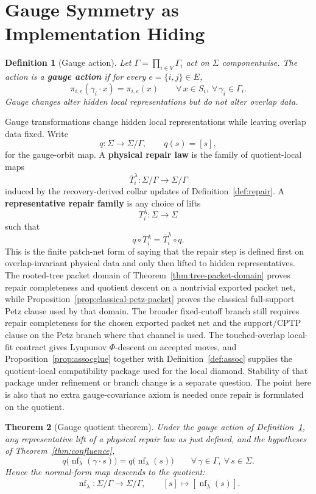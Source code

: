 \documentclass[11pt]{article}
\newtheorem{theorem}{Theorem}[section]
\newtheorem{definition}[theorem]{Definition}
\theoremstyle{remark}
\theoremstyle{plain}
\begin{document}
\section{Gauge Symmetry as Implementation Hiding}

\begin{definition}[Gauge action]\label{def:gauge}
Let $\Gamma = \prod_{i\in V}\Gamma_i$ act on $\Sigma$ componentwise. The action is a \textbf{gauge action} if for every $e=\{i,j\}\in E$,
\[
\pi_{i,e}(\gamma_i\cdot x)=\pi_{i,e}(x)
\qquad
\forall\, x\in S_i,\ \forall\, \gamma_i\in \Gamma_i.
\]
Gauge changes alter hidden local representations but do not alter overlap data.
\end{definition}

Gauge transformations change hidden local representations while leaving overlap data fixed. Write
\[
q:\Sigma\to \Sigma/\Gamma,
\qquad
q(s)=[s],
\]
for the gauge-orbit map. A \textbf{physical repair law} is the family of quotient-local maps
\[
\overline T_i^\lambda:\Sigma/\Gamma\to \Sigma/\Gamma
\]
induced by the recovery-derived collar updates of Definition~\ref{def:repair}. A
\textbf{representative repair family} is any choice of lifts
\[
T_i^\lambda:\Sigma\to\Sigma
\]
such that
\[
q\circ T_i^\lambda
=
\overline T_i^\lambda\circ q.
\]
This is the finite patch-net form of saying that the repair step is defined first on
overlap-invariant physical data and only then lifted to hidden representatives. The rooted-tree
packet domain of Theorem~\ref{thm:tree-packet-domain} proves repair completeness and quotient
descent on a nontrivial exported packet net, while Proposition~\ref{prop:classical-petz-packet}
proves the classical full-support Petz clause used by that domain. The broader fixed-cutoff
branch still requires repair completeness for the chosen exported packet net and the
support/CPTP clause on the Petz branch where that channel is used. The touched-overlap local-fit contract gives Lyapunov \(\Phi\)-descent on
accepted moves, and Proposition~\ref{prop:assocglue} together with
Definition~\ref{def:assoc} supplies the quotient-local compatibility package used for the local
diamond. Stability of that package under refinement or branch change is a separate question.
The point here is also that no extra gauge-covariance axiom is needed once repair is formulated
on the quotient.

\begin{theorem}[Gauge quotient theorem]\label{thm:gauge}
Under the gauge action of Definition~\ref{def:gauge}, any representative lift of a physical repair
law as just defined, and the hypotheses of Theorem~\ref{thm:confluence},
\[
q\bigl(\operatorname{nf}_\lambda(\gamma\cdot s)\bigr)
=
q\bigl(\operatorname{nf}_\lambda(s)\bigr)
\qquad
\forall\, \gamma\in\Gamma,\ \forall\, s\in\Sigma.
\]
Hence the normal-form map descends to the quotient:
\[
\overline{\operatorname{nf}}_\lambda:\Sigma/\Gamma \to \Sigma/\Gamma,
\qquad
[s]\mapsto [\operatorname{nf}_\lambda(s)].
\]
\end{theorem}
\end{document}
